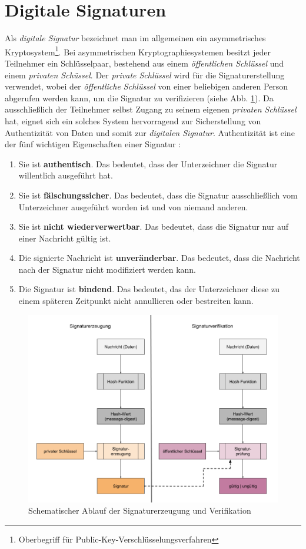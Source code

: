 \documentclass[11pt,a4paper,ngerman]{scrreprt}
\begin{document}
\section{Digitale Signaturen}
Als \textit{digitale Signatur} bezeichnet man im allgemeinen ein asymmetrisches Kryptosystem\footnote{Oberbegriff für Public-Key-Verschlüsselungsverfahren}. Bei asymmetrischen Kryptographiesystemen besitzt jeder Teilnehmer ein Schlüsselpaar, bestehend aus einem \emph{öffentlichen Schlüssel} und einem \emph{privaten Schüssel}. Der \emph{private Schlüssel} wird für die Signaturerstellung verwendet, wobei der \emph{öffentliche Schlüssel} von einer beliebigen anderen Person abgerufen werden kann, um die Signatur zu verifizieren (siehe Abb. \ref{fig:Signaturablauf}). Da ausschließlich der Teilnehmer selbst Zugang zu seinem eigenen \emph{privaten Schlüssel} hat, eignet sich ein solches System hervorragend zur Sicherstellung von Authentizität von Daten und somit zur \textit{digitalen Signatur}. Authentizität ist eine der fünf wichtigen Eigenschaften einer Signatur \cite{sch05}:
\begin{enumerate}
    \item Sie ist \textbf{authentisch}. Das bedeutet, dass der Unterzeichner die Signatur willentlich ausgeführt hat.
    \item Sie ist \textbf{fälschungssicher}. Das bedeutet, dass die Signatur ausschließlich vom Unterzeichner ausgeführt worden ist und von niemand anderen.
    \item Sie ist \textbf{nicht wiederverwertbar}. Das bedeutet, dass die Signatur nur auf einer Nachricht gültig ist.
    \item Die signierte Nachricht ist \textbf{unveränderbar}. Das bedeutet, dass die Nachricht nach der Signatur nicht modifiziert werden kann.
    \item Die Signatur ist \textbf{bindend}. Das bedeutet, das der Unterzeichner diese zu einem späteren Zeitpunkt nicht annullieren oder bestreiten kann.
\end{enumerate}
\clearpage
\begin{figure}[h]
    \centering
        \includegraphics[width=\textwidth]{Abbildungen/Ablauf_Signatur.png}
    \caption{Schematischer Ablauf der Signaturerzeugung und Verifikation}
    \label{fig:Signaturablauf}
\end{figure}
\end{document}
